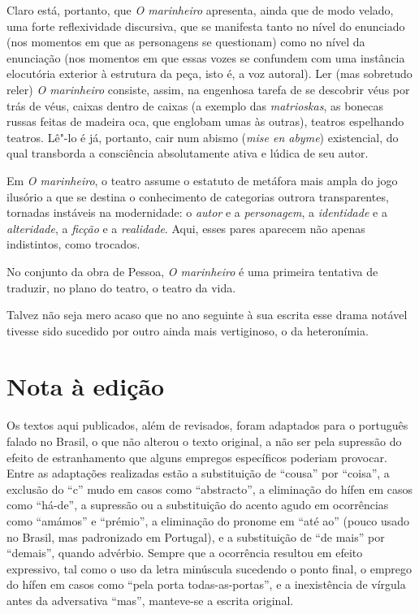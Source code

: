 Claro está, portanto, que \textit{O marinheiro} apresenta, ainda que de
modo velado, uma forte reflexividade discursiva, que se manifesta tanto
no nível do enunciado (nos momentos em que as personagens se
questionam) como no nível da enunciação (nos momentos em que essas
vozes se confundem com uma instância elocutória exterior à estrutura da
peça, isto é, a voz autoral). Ler (mas sobretudo reler)
\textit{O marinheiro} consiste, assim, na engenhosa tarefa de se
descobrir véus por trás de véus, caixas dentro de caixas (a exemplo das
\textit{matrioskas}, as bonecas
russas feitas de madeira oca, que englobam umas às outras), teatros
espelhando teatros. Lê"-lo é já, portanto, cair num abismo (\textit{mise
en abyme}) existencial, do qual transborda a consciência absolutamente
ativa e lúdica de seu autor.  

Em \textit{O
marinheiro}, o teatro assume o estatuto de metáfora
mais ampla do jogo ilusório a que se destina o conhecimento de
categorias outrora transparentes, tornadas instáveis na modernidade: o
\textit{autor} e a
\textit{personagem}, a
\textit{identidade} e a
\textit{alteridade}, a
\textit{ficção} e a
\textit{realidade}. Aqui, esses
pares aparecem não apenas indistintos, como trocados. 

No conjunto da obra de Pessoa, \textit{O marinheiro} 
é uma primeira
tentativa de traduzir, no plano do teatro, o teatro da vida. 

Talvez não seja mero acaso que no ano seguinte à sua escrita esse drama
notável tivesse sido sucedido por outro ainda mais vertiginoso, o da
heteronímia.

\section{Nota à edição}

Os textos aqui publicados, além de revisados, foram adaptados para o
português falado no Brasil, o que não alterou o texto original, a não
ser pela supressão do efeito de estranhamento que alguns empregos
específicos poderiam provocar. Entre as adaptações realizadas
estão a substituição de “cousa” por “coisa”, a exclusão do “c” mudo em
casos como “abstracto”, a eliminação do hífen em casos como “há-de”, a
supressão ou a substituição do acento agudo em ocorrências como
“amámos” e “prémio”, a eliminação do pronome em “até ao” (pouco usado
no Brasil, mas padronizado em Portugal), e a substituição de “de mais”
por “demais”, quando advérbio. Sempre que a ocorrência resultou em
efeito expressivo, tal como o uso da letra minúscula sucedendo o ponto
final, o emprego do hífen em casos como “pela porta todas-as-portas”, e
a inexistência de vírgula antes da adversativa “mas”, manteve-se a
escrita original. 

